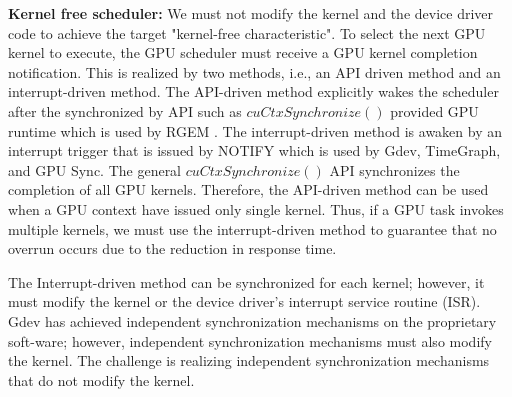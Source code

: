 \textbf{Kernel free scheduler:}
We must not modify the kernel and the device driver code to achieve the target "kernel-free characteristic".
To select the next GPU kernel to execute, the GPU scheduler must receive a GPU kernel completion notification.
This is realized by two methods, i.e., an API driven method and an interrupt-driven method.
The API-driven method explicitly wakes the scheduler after the synchronized by API such as $cuCtxSynchronize()$ provided GPU runtime which is used by RGEM\cite{kato:rgem} .
The interrupt-driven method is awaken by an interrupt trigger that is issued by NOTIFY which is used by Gdev, TimeGraph, and GPU Sync.
The general $cuCtxSynchronize()$ API synchronizes the completion of all GPU kernels.
Therefore, the API-driven method can be used when a GPU context have issued only single kernel.
Thus, if a GPU task invokes multiple kernels, we must use the interrupt-driven method to guarantee that no overrun occurs due to the reduction in response time.

The Interrupt-driven method can be synchronized for each kernel; however, it must modify the kernel or the device driver’s interrupt service routine (ISR).
Gdev has achieved independent synchronization mechanisms on the proprietary soft-ware;
however, independent synchronization mechanisms must also modify the kernel.
The challenge is realizing independent synchronization mechanisms that do not modify the kernel.
